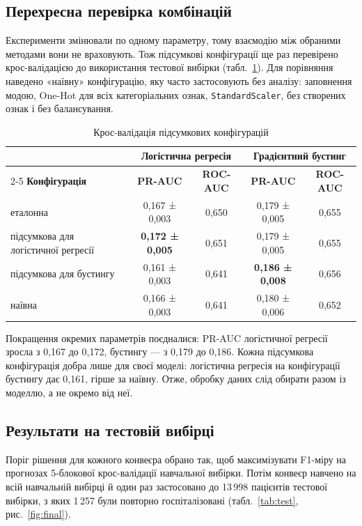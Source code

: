 \documentclass[14pt,a4paper]{extreport}
\begin{document}
\subsection{Перехресна перевірка комбінацій}

Експерименти змінювали по одному параметру, тому взаємодію між обраними методами вони не враховують. Тож підсумкові конфігурації ще раз перевірено крос-валідацією до використання тестової вибірки (табл.~\ref{tab:cv_final}). Для порівняння наведено «наївну» конфігурацію, яку часто застосовують без аналізу: заповнення модою, One-Hot для всіх категоріальних ознак, \texttt{StandardScaler}, без створених ознак і без балансування.

\begin{table}[H]
\caption{Крос-валідація підсумкових конфігурацій}
\label{tab:cv_final}
\small
\renewcommand{\arraystretch}{1.15}
\begin{tabularx}{\linewidth}{|X|c|c|c|c|}
\hline
 & \multicolumn{2}{c|}{\textbf{Логістична регресія}} & \multicolumn{2}{c|}{\textbf{Градієнтний бустинг}} \\
\cline{2-5}
\textbf{Конфігурація} & \textbf{PR-AUC} & \textbf{ROC-AUC} & \textbf{PR-AUC} & \textbf{ROC-AUC} \\
\hline
еталонна & 0,167 ± 0,003 & 0,650 & 0,179 ± 0,005 & 0,655 \\
\hline
підсумкова для логістичної регресії & \textbf{0,172 ± 0,005} & 0,651 & 0,179 ± 0,005 & 0,655 \\
\hline
підсумкова для бустингу & 0,161 ± 0,003 & 0,641 & \textbf{0,186 ± 0,008} & 0,656 \\
\hline
наївна & 0,166 ± 0,003 & 0,641 & 0,180 ± 0,006 & 0,652 \\
\hline
\end{tabularx}
\end{table}

Покращення окремих параметрів поєдналися: PR-AUC логістичної регресії зросла з 0,167 до 0,172, бустингу --- з 0,179 до 0,186. Кожна підсумкова конфігурація добра лише для своєї моделі: логістична регресія на конфігурації бустингу дає 0,161, гірше за наївну. Отже, обробку даних слід обирати разом із моделлю, а не окремо від неї.

\subsection{Результати на тестовій вибірці}

Поріг рішення для кожного конвеєра обрано так, щоб максимізувати F1-міру на прогнозах 5-блокової крос-валідації навчальної вибірки. Потім конвеєр навчено на всій навчальній вибірці й один раз застосовано до 13\,998 пацієнтів тестової вибірки, з яких 1\,257 були повторно госпіталізовані (табл.~\ref{tab:test}, рис.~\ref{fig:final}).
\end{document}
